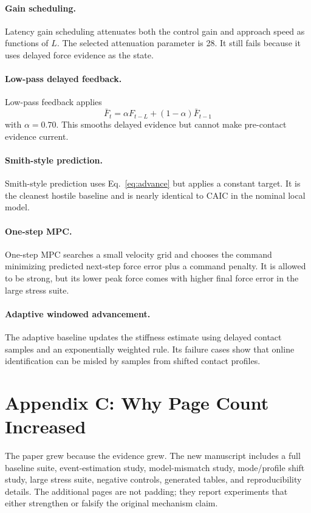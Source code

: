 \documentclass{article}
\newcommand{\lat}{L}
\newcommand{\force}{F}
\newcommand{\caic}{CAIC}
\begin{document}
\paragraph{Gain scheduling.}
Latency gain scheduling attenuates both the control gain and approach speed as functions of $\lat$. The selected attenuation parameter is 28. It still fails because it uses delayed force evidence as the state.

\paragraph{Low-pass delayed feedback.}
Low-pass feedback applies
\begin{equation}
\bar\force_t=\alpha\force_{t-\lat}+(1-\alpha)\bar\force_{t-1}
\end{equation}
with $\alpha=0.70$. This smooths delayed evidence but cannot make pre-contact evidence current.

\paragraph{Smith-style prediction.}
Smith-style prediction uses Eq.~\ref{eq:advance} but applies a constant target. It is the cleanest hostile baseline and is nearly identical to \caic{} in the nominal local model.

\paragraph{One-step MPC.}
One-step MPC searches a small velocity grid and chooses the command minimizing predicted next-step force error plus a command penalty. It is allowed to be strong, but its lower peak force comes with higher final force error in the large stress suite.

\paragraph{Adaptive windowed advancement.}
The adaptive baseline updates the stiffness estimate using delayed contact samples and an exponentially weighted rule. Its failure cases show that online identification can be misled by samples from shifted contact profiles.

\section{Appendix C: Why Page Count Increased}

The paper grew because the evidence grew. The new manuscript includes a full baseline suite, event-estimation study, model-mismatch study, mode/profile shift study, large stress suite, negative controls, generated tables, and reproducibility details. The additional pages are not padding; they report experiments that either strengthen or falsify the original mechanism claim.
\end{document}
